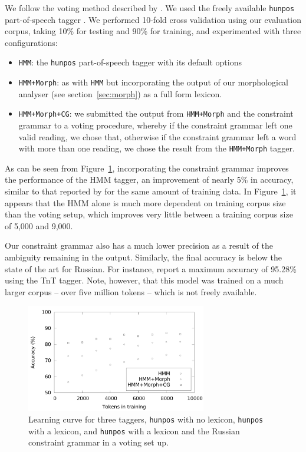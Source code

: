 \documentclass[11pt]{article}
\begin{document}
We follow the voting method described by . We used the freely available
\texttt{hunpos} part-of-speech tagger \cite{halacsy07}. We performed 10-fold
cross validation using our evaluation corpus, taking 10\% for testing and 90\% for training, and
experimented with three configurations:

\begin{itemize}
  \item \texttt{HMM}: the \texttt{hunpos} part-of-speech tagger with its default options
  \item \texttt{HMM+Morph}: as with \texttt{HMM} but incorporating the output of our 
    morphological analyser (see section~\ref{sec:morph}) as a full form lexicon.
  \item \texttt{HMM+Morph+CG}: we submitted the output from \texttt{HMM+Morph} and the 
    constraint grammar to a voting procedure, whereby if the constraint grammar left
    one valid reading, we chose that, otherwise if the constraint grammar left a word
    with more than one reading, we chose the result from the \texttt{HMM+Morph} tagger.
\end{itemize}

As can be seen from Figure~\ref{fig:curve}, incorporating the constraint grammar 
improves the performance of the HMM tagger, an improvement of nearly 5\% in accuracy,
similar to that reported by  for the same amount of training data. 
In Figure~\ref{fig:curve}, it appears that the HMM alone is much more dependent on 
training corpus size than the voting setup, which improves very little between a training
corpus size of 5,000 and 9,000.

Our constraint grammar also has a much lower precision as a result of the ambiguity remaining
in the output. Similarly, the final accuracy is below the state of the art for Russian. For instance, 
 report a maximum accuracy of 95.28\% using the TnT tagger.
Note, however, that this model was trained on a much larger corpus -- over five million
tokens -- which is not freely available.

\begin{figure}
  \centering
  \includegraphics[width=0.70\textwidth]{graphics/learning-curve.pdf}
  \caption{Learning curve for three taggers, \texttt{hunpos} with no lexicon, 
    \texttt{hunpos} with a lexicon, and \texttt{hunpos} with a lexicon and the 
    Russian constraint grammar in a voting set up.}
  \label{fig:curve}
\end{figure}
\end{document}
